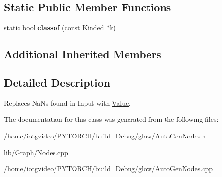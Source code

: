 \subsection*{Static Public Member Functions}
\begin{DoxyCompactItemize}
\item 
\mbox{\label{classglow_1_1_replace_na_n_node_a2ce9901c6554c14a8ccb332f7cef4f87}} 
static bool {\bfseries classof} (const \hyperlink{classglow_1_1_kinded}{Kinded} $\ast$k)
\end{DoxyCompactItemize}
\subsection*{Additional Inherited Members}


\subsection{Detailed Description}
Replaces Na\+Ns found in Input with \hyperlink{classglow_1_1_value}{Value}. 

The documentation for this class was generated from the following files\+:\begin{DoxyCompactItemize}
\item 
/home/iotgvideo/\+P\+Y\+T\+O\+R\+C\+H/build\+\_\+\+Debug/glow/Auto\+Gen\+Nodes.\+h\item 
lib/\+Graph/Nodes.\+cpp\item 
/home/iotgvideo/\+P\+Y\+T\+O\+R\+C\+H/build\+\_\+\+Debug/glow/Auto\+Gen\+Nodes.\+cpp\end{DoxyCompactItemize}
